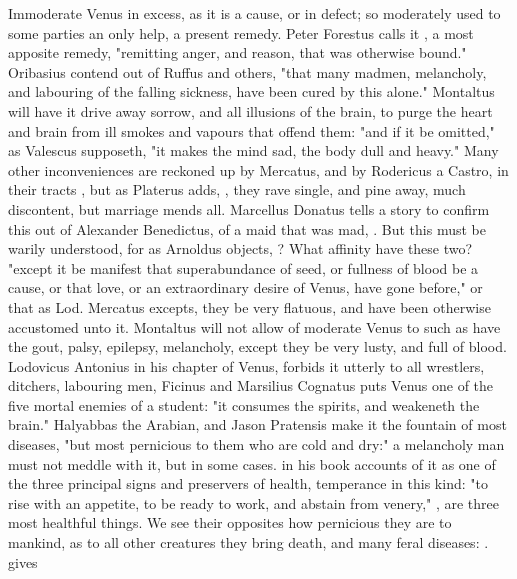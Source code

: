 {Immoderate Venus in excess, as it is a cause, or in defect; so moderately used to some parties an only help, a present remedy. Peter Forestus calls it , a most apposite remedy, "remitting anger, and reason, that was otherwise bound." \Avicenna{}  Oribasius  contend out of Ruffus and others, "that many madmen, melancholy, and labouring of the falling sickness, have been cured by this alone." Montaltus  will have it drive away sorrow, and all illusions of the brain, to purge the heart and brain from ill smokes and vapours that offend them: "and if it be omitted," as Valescus supposeth, "it makes the mind sad, the body dull and heavy." Many other inconveniences are reckoned up by Mercatus, and by Rodericus a Castro, in their tracts , but as Platerus adds, , they rave single, and pine away, much discontent, but marriage mends all. Marcellus Donatus  tells a story to confirm this out of Alexander Benedictus, of a maid that was mad, . But this must be warily understood, for as Arnoldus objects,  ? What affinity have these two? "except it be manifest that superabundance of seed, or fullness of blood be a cause, or that love, or an extraordinary desire of Venus, have gone before," or that as Lod. Mercatus excepts, they be very flatuous, and have been otherwise accustomed unto it. Montaltus  will not allow of moderate Venus to such as have the gout, palsy, epilepsy, melancholy, except they be very lusty, and full of blood. Lodovicus Antonius  in his chapter of Venus, forbids it utterly to all wrestlers, ditchers, labouring men, \etc{} Ficinus and Marsilius Cognatus puts Venus one of the five mortal enemies of a student: "it consumes the spirits, and weakeneth the brain." Halyabbas the Arabian,  and Jason Pratensis make it the fountain of most diseases, "but most pernicious to them who are cold and dry:" a melancholy man must not meddle with it, but in some cases. \Plutarch{} in his book  accounts of it as one of the three principal signs and preservers of health, temperance in this kind: "to rise with an appetite, to be ready to work, and abstain from venery," , are three most healthful things. We see their opposites how pernicious they are to mankind, as to all other creatures they bring death, and many feral diseases: . \Aristotle{} gives }
